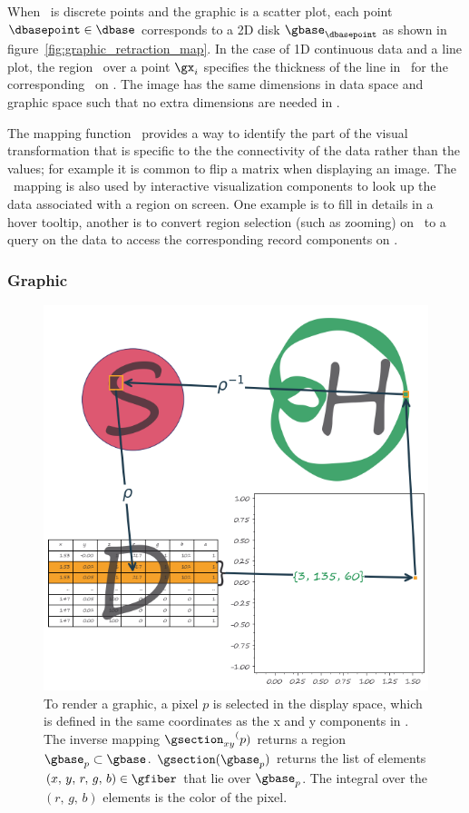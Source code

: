 \documentclass[../main.tex]{subfiles}
\begin{document}
When \dbase\ is discrete points and the graphic is a scatter plot, each point $\dbasepoint \in \dbase$ corresponds to a 2D disk $\gbase_{\dbasepoint}$ as shown in figure~\ref{fig:graphic_retraction_map}. In the case of 1D continuous data and a line plot, the region \gy\ over a point $\gx_i$ specifies the thickness of the line in \gbase\ for the corresponding \dsection\ on \dbasepoint. The image has the same dimensions in data space and graphic space such that no extra dimensions are needed in \gbase. 

The mapping function \vindex\ provides a way to identify the part of the visual transformation that is specific to the the connectivity of the data rather than the values; for example it is common to flip a matrix when displaying an image. The \vindex\ mapping is also used by interactive visualization components to look up the data associated with a region on screen.  One example is to fill in details in a hover tooltip, another is to convert region selection (such as zooming) on \gbase\ to a query on the data to access the corresponding record components on \dbase.

\subsubsection{Graphic \gsection}
\label{sec:graphic_section}
\begin{figure}[H]
    \includegraphics[width=\textwidth]{figures/math/render.png}
    \caption{To render a graphic, a pixel $p$ is selected in the display space, which is defined in the same coordinates as the x and y components in \gfiber.  The inverse mapping ${\gsection_{xy}}^(p)$ returns a region $\gbase_{p} \subset \gbase$. $\gsection(\gbase_{p})$ returns the list of elements $(x,\,y,\,r,\,g,\,b) \in \gfiber$ that lie over $\gbase_{p}$. The integral over the $(r,\,g,\,b)$ elements is the color of the pixel.}
    \label{fig:graphic_rho_lookup}
\end{figure}
\end{document}
